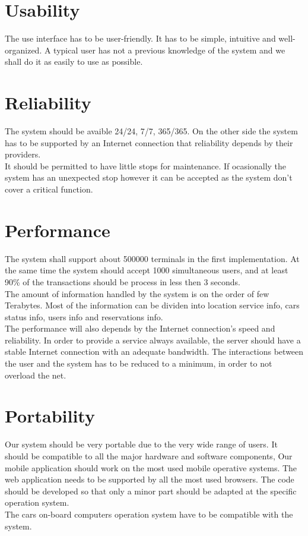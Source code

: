 \section{Usability}
 The use interface has to be user-friendly. It has to be simple, intuitive and well-organized. A typical user has not a previous knowledge of the system and we shall do it as easily to use as possible.

\section{Reliability}
The system should be avaible 24/24, 7/7, 365/365. On the other side the system has to be supported by an Internet connection that reliability depends by their providers.  
\\It should be permitted to have little stops for maintenance. If ocasionally the system has an unexpected stop however it can be accepted as the system don't cover a critical function. 

\section{Performance}
The system shall support about 500000 terminals in the first implementation. At the same time the system should accept 1000 simultaneous users, and at least 90\% of the transactions should be process in less then 3 seconds.
\\The amount of information handled by the system is on the order of few Terabytes. Most of the information can be dividen into location service info, cars status info, users info and reservations info.
\\The performance will also depends by the Internet connection’s speed and reliability. In order to provide a service always available, the server should have a stable Internet connection with an adequate bandwidth.
The interactions between the user and the system has to be reduced to a minimum, in order to not overload the net. 

\section{Portability}
Our system should be very portable due to the very wide range of users. It should be compatible to all the major hardware and software components, Our mobile application should work on the most used mobile operative systems. The web application needs to be supported by all the most used browsers. The code should be developed so that only a minor part should be adapted at the specific operation system.
\\The cars on-board computers operation system have to be compatible with the system.%

